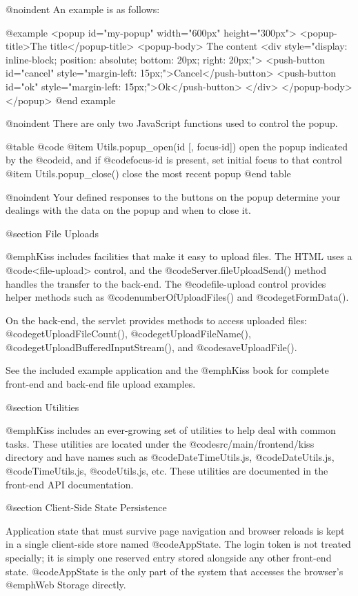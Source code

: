 @noindent
An example is as follows:

@example
<popup id="my-popup" width="600px" height="300px">
    <popup-title>The title</popup-title>
    <popup-body>
        The content
        <div style="display: inline-block; position: absolute; bottom: 20px; right: 20px;">
            <push-button id="cancel" style="margin-left: 15px;">Cancel</push-button>
            <push-button id="ok" style="margin-left: 15px;">Ok</push-button>
        </div>
    </popup-body>
</popup>
@end example

@noindent
There are only two JavaScript functions used to control the popup.

@table @code
@item Utils.popup_open(id [, focus-id])
open the popup indicated by the @code{id}, and if @code{focus-id} is present, set initial focus to that control
@item Utils.popup_close()
close the most recent popup
@end table

@noindent
Your defined responses to the buttons on the popup determine your dealings with the
data on the popup and when to close it.

@section File Uploads

@emph{Kiss} includes facilities that make it easy to upload files.
The HTML uses a @code{<file-upload>} control, and the
@code{Server.fileUploadSend()} method handles the transfer to the
back-end.  The @code{file-upload} control provides helper methods
such as @code{numberOfUploadFiles()} and @code{getFormData()}.

On the back-end, the servlet provides methods to access uploaded
files: @code{getUploadFileCount()}, @code{getUploadFileName()},
@code{getUploadBufferedInputStream()}, and @code{saveUploadFile()}.

See the included example application and the @emph{Kiss} book for
complete front-end and back-end file upload examples.




@section Utilities

@emph{Kiss} includes an ever-growing set of utilities to help deal with common tasks.
These utilities are located under the @code{src/main/frontend/kiss} directory and have names such as
@code{DateTimeUtils.js}, @code{DateUtils.js}, @code{TimeUtils.js}, @code{Utils.js}, etc.  These utilities
are documented in the front-end API documentation.

@section Client-Side State Persistence

Application state that must survive page navigation and browser reloads
is kept in a single client-side store named @code{AppState}.  The login
token is not treated specially; it is simply one reserved entry stored
alongside any other front-end state.  @code{AppState} is the only part
of the system that accesses the browser's @emph{Web Storage} directly.

